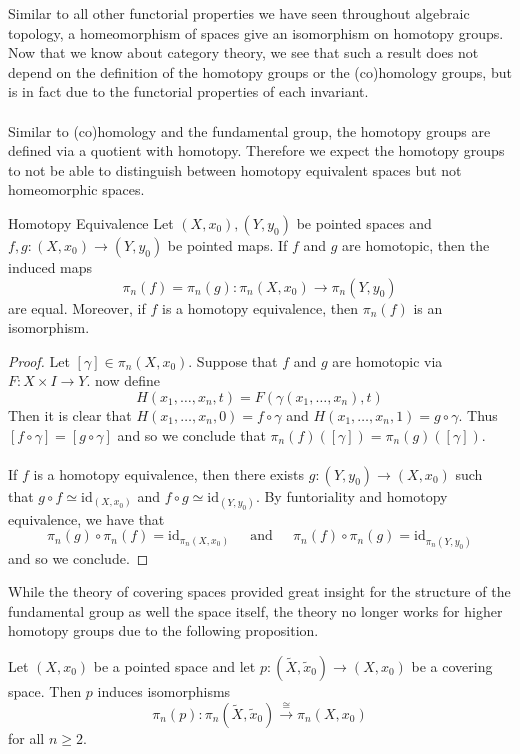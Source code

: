 \documentclass[a4paper]{article}
\begin{document}
Similar to all other functorial properties we have seen throughout algebraic topology, a homeomorphism of spaces give an isomorphism on homotopy groups. Now that we know about category theory, we see that such a result does not depend on the definition of the homotopy groups or the (co)homology groups, but is in fact due to the functorial properties of each invariant. \\~\\

Similar to (co)homology and the fundamental group, the homotopy groups are defined via a quotient with homotopy. Therefore we expect the homotopy groups to not be able to distinguish between homotopy equivalent spaces but not homeomorphic spaces. 

\begin{thm}{Homotopy Equivalence}{} Let $(X,x_0),(Y,y_0)$ be pointed spaces and $f,g:(X,x_0)\to (Y,y_0)$ be pointed maps. If $f$ and $g$ are homotopic, then the induced maps $$\pi_n(f)=\pi_n(g):\pi_n(X,x_0)\to\pi_n(Y,y_0)$$ are equal. Moreover, if $f$ is a homotopy equivalence, then $\pi_n(f)$ is an isomorphism. \tcbline
\begin{proof}
Let $[\gamma]\in\pi_n(X,x_0)$. Suppose that $f$ and $g$ are homotopic via $F:X\times I\to Y$. now define $$H(x_1,\dots,x_n,t)=F(\gamma(x_1,\dots,x_n),t)$$ Then it is clear that $H(x_1,\dots,x_n,0)=f\circ\gamma$ and $H(x_1,\dots,x_n,1)=g\circ\gamma$. Thus $[f\circ\gamma]=[g\circ\gamma]$ and so we conclude that $\pi_n(f)([\gamma])=\pi_n(g)([\gamma])$. \\~\\

If $f$ is a homotopy equivalence, then there exists $g:(Y,y_0)\to(X,x_0)$ such that $g\circ f\simeq\text{id}_{(X,x_0)}$ and $f\circ g\simeq\text{id}_{(Y,y_0)}$. By funtoriality and homotopy equivalence, we have that $$\pi_n(g)\circ\pi_n(f)=\text{id}_{\pi_n(X,x_0)}\;\;\;\;\text{ and }\;\;\;\;\pi_n(f)\circ\pi_n(g)=\text{id}_{\pi_n(Y,y_0)}$$ and so we conclude. 
\end{proof}
\end{thm}

While the theory of covering spaces provided great insight for the structure of the fundamental group as well the space itself, the theory no longer works for higher homotopy groups due to the following proposition. 

\begin{prp}{}{} Let $(X,x_0)$ be a pointed space and let $p:(\tilde{X},\tilde{x}_0)\to(X,x_0)$ be a covering space. Then $p$ induces isomorphisms $$\pi_n(p):\pi_n(\tilde{X},\tilde{x}_0)\overset{\cong}{\longrightarrow}\pi_n(X,x_0)$$ for all $n\geq 2$. 
\end{prp}
\end{document}

